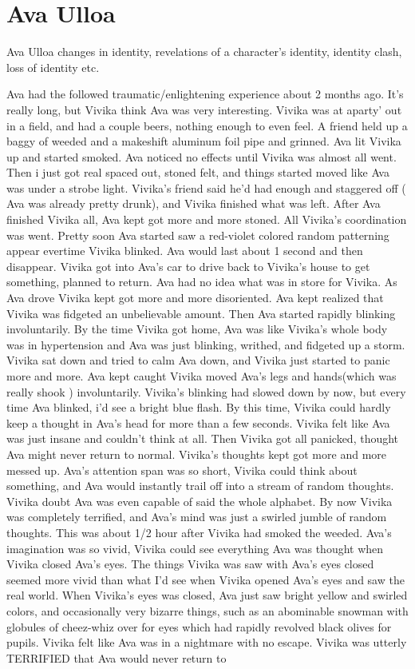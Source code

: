 \documentclass[12pt]{book}
\begin{document}
\chapter{Ava Ulloa}

Ava Ulloa changes in identity, revelations of a character's identity, identity clash, loss of identity etc.



Ava had the followed traumatic/enlightening experience about 2 months ago. It's really long, but Vivika think Ava was very interesting. Vivika was at aparty' out in a field, and had a couple beers, nothing enough to even feel. A friend held up a baggy of weeded and a makeshift aluminum foil pipe and grinned. Ava lit Vivika up and started smoked. Ava noticed no effects until Vivika was almost all went. Then i just got real spaced out, stoned felt, and things started moved like Ava was under a strobe light. Vivika's friend said he'd had enough and staggered off ( Ava was already pretty drunk), and Vivika finished what was left. After Ava finished Vivika all, Ava kept got more and more stoned. All Vivika's coordination was went. Pretty soon Ava started saw a red-violet colored random patterning appear evertime Vivika blinked. Ava would last about 1 second and then disappear. Vivika got into Ava's car to drive back to Vivika's house to get something, planned to return. Ava had no idea what was in store for Vivika. As Ava drove Vivika kept got more and more disoriented. Ava kept realized that Vivika was fidgeted an unbelievable amount. Then Ava started rapidly blinking involuntarily. By the time Vivika got home, Ava was like Vivika's whole body was in hypertension and Ava was just blinking, writhed, and fidgeted up a storm. Vivika sat down and tried to calm Ava down, and Vivika just started to panic more and more. Ava kept caught Vivika moved Ava's legs and hands(which was really shook ) involuntarily. Vivika's blinking had slowed down by now, but every time Ava blinked, i'd see a bright blue flash. By this time, Vivika could hardly keep a thought in Ava's head for more than a few seconds. Vivika felt like Ava was just insane and couldn't think at all. Then Vivika got all panicked, thought Ava might never return to normal. Vivika's thoughts kept got more and more messed up. Ava's attention span was so short, Vivika could think about something, and Ava would instantly trail off into a stream of random thoughts. Vivika doubt Ava was even capable of said the whole alphabet. By now Vivika was completely terrified, and Ava's mind was just a swirled jumble of random thoughts. This was about 1/2 hour after Vivika had smoked the weeded. Ava's imagination was so vivid, Vivika could see everything Ava was thought when Vivika closed Ava's eyes. The things Vivika was saw with Ava's eyes closed seemed more vivid than what I'd see when Vivika opened Ava's eyes and saw the real world. When Vivika's eyes was closed, Ava just saw bright yellow and swirled colors, and occasionally very bizarre things, such as an abominable snowman with globules of cheez-whiz over for eyes which had rapidly revolved black olives for pupils. Vivika felt like Ava was in a nightmare with no escape. Vivika was utterly TERRIFIED that Ava would never return to 
\end{document}
